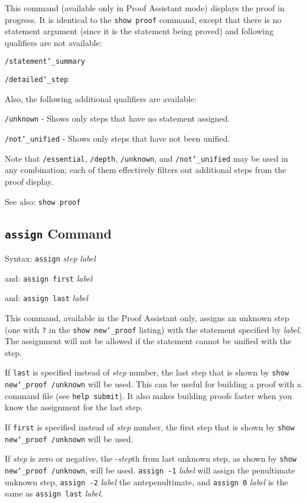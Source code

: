 This command (available only in Proof Assistant mode) displays the proof
in progress.  It is identical to the \texttt{show proof} command, except that
there is no statement argument (since it is the statement being proved) and
following qualifiers are not available:

    \texttt{/statement{\char`\_}summary}

    \texttt{/detailed{\char`\_}step}

Also, the following additional qualifiers are available:

    \texttt{/unknown} - Shows only steps that have no statement assigned.

    \texttt{/not{\char`\_}unified} - Shows only steps that have not been unified.

Note that \texttt{/essential}, \texttt{/depth}, \texttt{/unknown}, and
\texttt{/not{\char`\_}unified} may be
used in any combination; each of them effectively filters out additional
steps from the proof display.

See also:  \texttt{show proof}






\subsection{\texttt{assign} Command}
Syntax:   \texttt{assign} {\em step} {\em label}

   and:   \texttt{assign first} {\em label}

   and:   \texttt{assign last} {\em label}


This command, available in the Proof Assistant only, assigns an unknown
step (one with \texttt{?} in the \texttt{show new{\char`\_}proof}
listing) with the statement specified by {\em label}.  The assignment
will not be allowed if the statement cannot be unified with the step.

If \texttt{last} is specified instead of {\em step} number, the last
step that is shown by \texttt{show new{\char`\_}proof /unknown} will be
used.  This can be useful for building a proof with a command file (see
\texttt{help submit}).  It also makes building proofs faster when you know
the assignment for the last step.

If \texttt{first} is specified instead of {\em step} number, the first
step that is shown by \texttt{show new{\char`\_}proof /unknown} will be
used.

If {\em step} is zero or negative, the -{\em step}th from last unknown
step, as shown by \texttt{show new{\char`\_}proof /unknown}, will be
used.  \texttt{assign -1} {\em label} will assign the penultimate
unknown step, \texttt{assign -2} {\em label} the antepenultimate, and
\texttt{assign 0} {\em label} is the same as \texttt{assign last} {\em
label}.

